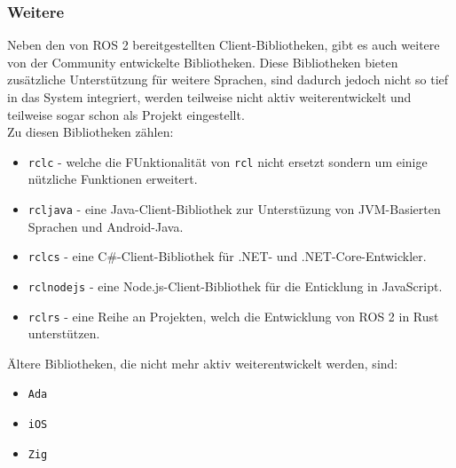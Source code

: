 \subsubsection{Weitere}\label{subsubsec:ROS2Weitere}
Neben den von \ac{ROS} 2 bereitgestellten Client-Bibliotheken, gibt es auch weitere von der Community entwickelte Bibliotheken. Diese Bibliotheken bieten zusätzliche Unterstützung für weitere Sprachen, sind dadurch jedoch nicht so tief in das System integriert, werden teilweise nicht aktiv weiterentwickelt und teilweise sogar schon als Projekt eingestellt.\\
Zu diesen Bibliotheken zählen:\\
\begin{itemize}
    \item \texttt{rclc} - welche die FUnktionalität von \texttt{rcl} nicht ersetzt sondern um einige nützliche Funktionen erweitert.\\
    \item \texttt{rcljava} - eine Java-Client-Bibliothek zur Unterstüzung von \ac{JVM}-Basierten Sprachen und Android-Java.\\
    \item \texttt{rclcs} - eine C\#-Client-Bibliothek für .NET- und .NET-Core-Entwickler.\\
    \item \texttt{rclnodejs} - eine Node.js-Client-Bibliothek für die Enticklung in JavaScript.\\
    \item \texttt{rclrs} - eine Reihe an Projekten, welch die Entwicklung von \ac{ROS} 2 in Rust unterstützen.\\
\end{itemize}
Ältere Bibliotheken, die nicht mehr aktiv weiterentwickelt werden, sind:\\
\begin{itemize}
    \item \texttt{Ada}
    \item \texttt{iOS}
    \item \texttt{Zig}
\end{itemize}


